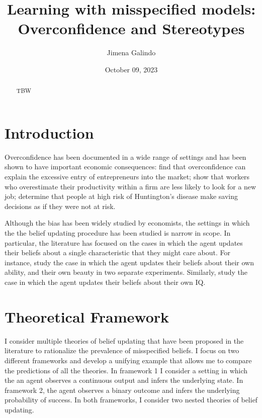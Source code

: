 \documentclass[
  12pt,
]{article}
\title{Learning with misspecified models: Overconfidence and
Stereotypes}
\author{Jimena Galindo}
\date{October 09, 2023}
\begin{document}
\maketitle
\begin{abstract}
TBW
\end{abstract}

\hypertarget{introduction}{%
\section{Introduction}\label{introduction}}

Overconfidence has been documented in a wide range of settings and has
been shown to have important economic consequences: \citet{Camerer1999}
find that overconfidence can explain the excessive entry of
entrepreneurs into the market; \citet{Hoffman2020} show that workers who
overestimate their productivity within a firm are less likely to look
for a new job; \citet{Oster2013} determine that people at high risk of
Huntington's disease make saving decisions as if they were not at risk.

Although the bias has been widely studied by economists, the settings in
which the the belief updating procedure has been studied is narrow in
scope. In particular, the literature has focused on the cases in which
the agent updates their beliefs about a single characteristic that they
might care about. For instance, \citet{Eil2011} study the case in which
the agent updates their beliefs about their own ability, and their own
beauty in two separate experiments. Similarly, \citet{Benoit2015} study
the case in which the agent updates their beliefs about their own IQ.

\hypertarget{theoretical-framework}{%
\section{Theoretical Framework}\label{theoretical-framework}}

I consider multiple theories of belief updating that have been proposed
in the literature to rationalize the prevalence of misspecified beliefs.
I focus on two different frameworks and develop a unifying example that
allows me to compare the predictions of all the theories. In framework 1
I consider a setting in which the an agent observes a continuous output
and infers the underlying state. In framework 2, the agent observes a
binary outcome and infers the underlying probability of success. In both
frameworks, I consider two nested theories of belief updating.
\end{document}
